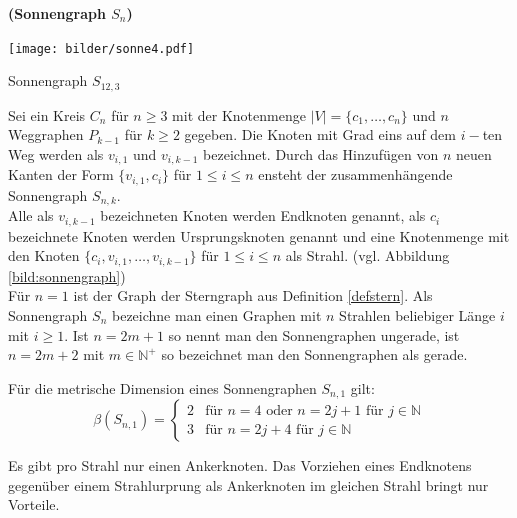 \begin{defi}{\textbf{(Sonnengraph $S_{n}$)}}
\label{sun}
\begin{floatingfigure}[r]{180pt}
{\centering
\hspace*{0.1cm}
 		 \texttt{[image: bilder/sonne4.pdf]}}
   \caption{Sonnengraph $S_{12,3}$}
   \label{bild:sonnengraph}
\end{floatingfigure}
Sei ein Kreis $C_n$ für $n \geq 3$ mit der Knotenmenge $|V|=\{ c_1, \ldots , c_n \}$ und $n$ Weggraphen $P_{k-1}$ für $k \geq 2$ gegeben. Die Knoten mit Grad eins auf dem $i-$ten Weg werden als $v_{i,1}$ und $v_{i,k-1}$ bezeichnet. Durch das Hinzufügen von $n$ neuen Kanten der Form $\{v_{i,1},c_i\}$ für $1 \leq i \leq n$ ensteht der zusammenhängende Sonnengraph $S_{n,k}$.\\
Alle als $v_{i,k-1}$ bezeichneten Knoten werden Endknoten genannt, als $c_i$ bezeichnete Knoten werden Ursprungsknoten genannt und eine Knotenmenge mit den Knoten $\{c_i,v_{i,1}, \ldots ,v_{i,k-1}\}$ für $1 \leq i \leq n$ als Strahl. (vgl. Abbildung \ref{bild:sonnengraph})\\
Für $n=1$ ist der Graph der Sterngraph aus Definition \ref{defstern}. Als Sonnengraph $S_n$ bezeichne man einen Graphen mit $n$ Strahlen beliebiger Länge $i$ mit $i \geq 1$. Ist $n=2m+1$ so nennt man den Sonnengraphen ungerade, ist $n=2m+2$ mit $m \in \mathbb{N}^+$ so bezeichnet man den Sonnengraphen als gerade.
\par
\end{defi}
\newpage
\begin{lem}\cite{bases}
\label{sun1}
Für die metrische Dimension eines Sonnengraphen $S_{n,1}$ gilt:
\begin{equation}
   \beta(S_{n,1})=
   \begin{cases}
     2 & \text{f\"ur } n = 4 \text{ oder } n = 2j+1 \text{ f\"ur } j \in \mathbb{N} \\
     3 & \text{f\"ur } n = 2j+4 \text{ f\"ur } j \in \mathbb{N} 
   \end{cases}
\end{equation}
\end{lem}
\begin{lem}
\label{knotenimstrahl}
Es gibt pro Strahl nur einen Ankerknoten. Das Vorziehen eines Endknotens gegenüber einem Strahlurprung als Ankerknoten im gleichen Strahl bringt nur Vorteile.
\end{lem}
